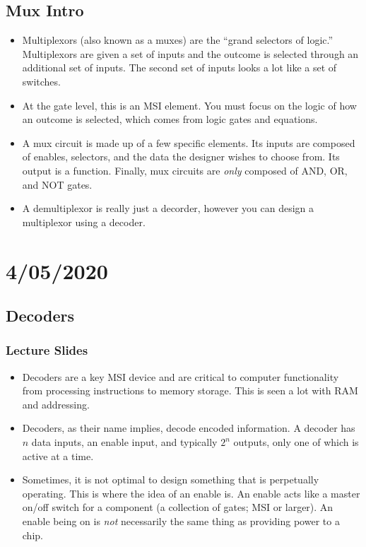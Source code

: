 \documentclass[10pt,a4paper]{article}
\begin{document}
\subsection{Mux Intro}
\begin{itemize}
\item Multiplexors (also known as a muxes) are the ``grand selectors of logic.'' Multiplexors are given a set of inputs and the outcome is selected through an additional set of inputs. The second set of inputs looks a lot like a set of switches.
\item At the gate level, this is an MSI element. You must focus on the logic of how an outcome is selected, which comes from logic gates and equations. 
\item A mux circuit is made up of a few specific elements. Its inputs are composed of enables, selectors, and the data the designer wishes to choose from. Its output is a function. Finally, mux circuits are \textit{only} composed of AND, OR, and NOT gates.
\item A demultiplexor is really just a decorder, however you can design a multiplexor using a decoder.
\end{itemize}
\pagebreak
\section{4/05/2020}
\subsection{Decoders}
\subsubsection{Lecture Slides}
\begin{itemize}
\item Decoders are a key MSI device and are critical to computer functionality from processing instructions to memory storage. This is seen a lot with RAM and addressing.
\item Decoders, as their name implies, decode encoded information. A decoder has $n$ data inputs, an enable input, and typically $2^n$ outputs, only one of which is active at a time. 
\item Sometimes, it is not optimal to design something that is perpetually operating. This is where the idea of an enable is. An enable acts like a master on/off switch for a component (a collection of gates; MSI or larger). An enable being on is \textit{not} necessarily the same thing as providing power to a chip. 
\end{itemize}
\end{document}
